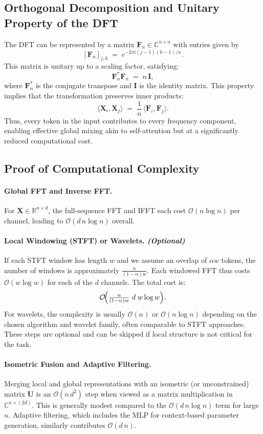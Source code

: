 \subsection{Orthogonal Decomposition and Unitary Property of the DFT}
The DFT can be represented by a matrix \(\mathbf{F}_n \in \mathbb{C}^{n \times n}\) with entries given by 
\[
[\mathbf{F}_n]_{j,k} \;=\; e^{-2\pi i (j-1)(k-1)/n}.
\]
This matrix is unitary up to a scaling factor, satisfying:
\[
\mathbf{F}_n^* \mathbf{F}_n \;=\; n\,\mathbf{I},
\]
where \(\mathbf{F}_n^*\) is the conjugate transpose and \(\mathbf{I}\) is the identity matrix. This property implies that the transformation preserves inner products:
\[
\langle \mathbf{X}_i, \mathbf{X}_j \rangle \;=\; \frac{1}{n}\,\langle \mathbf{F}_i, \mathbf{F}_j \rangle.
\]
Thus, every token in the input contributes to every frequency component, enabling effective global mixing akin to self-attention but at a significantly reduced computational cost.

\subsection{Proof of Computational Complexity}
\label{sec:proof_complexity}

\paragraph{Global FFT and Inverse FFT.}
For \(\mathbf{X} \in \mathbb{R}^{n \times d}\), the full-sequence FFT and IFFT each cost \(\mathcal{O}(n \log n)\) per channel, leading to \(\mathcal{O}(d\,n \log n)\) overall.

\paragraph{Local Windowing (STFT) or Wavelets. \emph{(Optional)}}
If each STFT window has length \(w\) and we assume an overlap of \(\alpha w\) tokens, the number of windows is approximately \(\frac{n}{(1-\alpha)w}\). Each windowed FFT thus costs \(\mathcal{O}(w \log w)\) for each of the \(d\) channels. The total cost is:
\[
\mathcal{O}\!\Bigl(\tfrac{n}{(1-\alpha)w} \;d\; w \log w\Bigr).
\]
For wavelets, the complexity is usually \(\mathcal{O}(n)\) or \(\mathcal{O}(n \log n)\) depending on the chosen algorithm and wavelet family, often comparable to STFT approaches. These steps are optional and can be skipped if local structure is not critical for the task.

\paragraph{Isometric Fusion and Adaptive Filtering.}
Merging local and global representations with an isometric (or unconstrained) matrix \(\mathbf{U}\) is an \(\mathcal{O}(n \, d^2)\) step when viewed as a matrix multiplication in \(\mathbb{C}^{n \times (2d)}\). This is generally modest compared to the \(\mathcal{O}(d\,n \log n)\) term for large \(n\). Adaptive filtering, which includes the MLP for context-based parameter generation, similarly contributes \(\mathcal{O}(d\,n)\).

